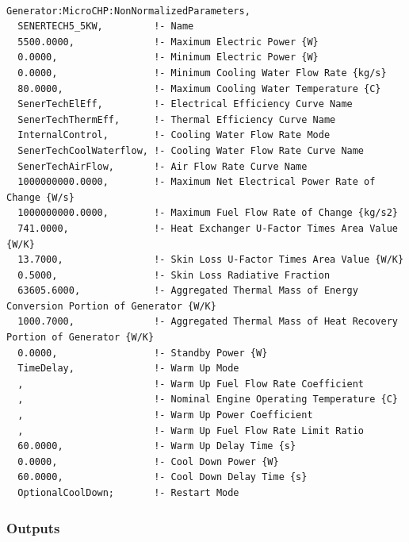 \begin{lstlisting}

Generator:MicroCHP:NonNormalizedParameters,
  SENERTECH5_5KW,         !- Name
  5500.0000,              !- Maximum Electric Power {W}
  0.0000,                 !- Minimum Electric Power {W}
  0.0000,                 !- Minimum Cooling Water Flow Rate {kg/s}
  80.0000,                !- Maximum Cooling Water Temperature {C}
  SenerTechElEff,         !- Electrical Efficiency Curve Name
  SenerTechThermEff,      !- Thermal Efficiency Curve Name
  InternalControl,        !- Cooling Water Flow Rate Mode
  SenerTechCoolWaterflow, !- Cooling Water Flow Rate Curve Name
  SenerTechAirFlow,       !- Air Flow Rate Curve Name
  1000000000.0000,        !- Maximum Net Electrical Power Rate of Change {W/s}
  1000000000.0000,        !- Maximum Fuel Flow Rate of Change {kg/s2}
  741.0000,               !- Heat Exchanger U-Factor Times Area Value {W/K}
  13.7000,                !- Skin Loss U-Factor Times Area Value {W/K}
  0.5000,                 !- Skin Loss Radiative Fraction
  63605.6000,             !- Aggregated Thermal Mass of Energy Conversion Portion of Generator {W/K}
  1000.7000,              !- Aggregated Thermal Mass of Heat Recovery Portion of Generator {W/K}
  0.0000,                 !- Standby Power {W}
  TimeDelay,              !- Warm Up Mode
  ,                       !- Warm Up Fuel Flow Rate Coefficient
  ,                       !- Nominal Engine Operating Temperature {C}
  ,                       !- Warm Up Power Coefficient
  ,                       !- Warm Up Fuel Flow Rate Limit Ratio
  60.0000,                !- Warm Up Delay Time {s}
  0.0000,                 !- Cool Down Power {W}
  60.0000,                !- Cool Down Delay Time {s}
  OptionalCoolDown;       !- Restart Mode
\end{lstlisting}

\subsubsection{Outputs}\label{outputs-8-001}

